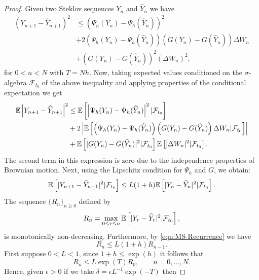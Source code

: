 	\begin{proof}
		Given two Steklov sequences $Y_n$ and $\widehat{Y}_n$ we have
		\begin{align*}
		\left(Y_{n+1}-\widehat{Y}_{n+1}\right)^ 2
		&\leq
		\left(
			\Psi_h(Y_n)
			-
			\Psi_h(\widehat{Y}_n)
		\right)^2 \\
		&+
		2\left(
		\Psi_h(Y_n)
			-
		\Psi_h(\widehat{Y}_n)
		\right)
		\left(
			G(Y_n)-G(\widehat{Y}_n)
		\right)
		\Delta W_n\\
		&+
		(G(Y_n)-G(\widehat{Y}_n))^2
		(\Delta W_n)^2,
		\end{align*}
		for $0<n<N$ with $T=Nh$. Now, taking expected values conditioned on the
		$\sigma$-algebra $\mathcal{F}_{t_0}$ of the above inequality and applying
		properties of the conditional expectation we get
		\begin{align*}
		\mathbb{E}\left|Y_{n+1}-\widehat{Y}_{n+1}\right|^2
		&\leq
		\mathbb{E}\left[
			\left|
			\Psi_h(Y_n)
			-
			\Psi_h(\widehat{Y}_n)
			\right|^2
		|\mathcal{F}_{t_0}\right]
		\\
		&+
		2\left|
		\mathbb{E}\left[
			\left(
			\Psi_h(Y_n)
			-
			\Psi_h(\widehat{Y}_n)
			\right)
		\left(
			G(Y_n)-G(\widehat{Y}_n)
		\right)
		\Delta W_n|\mathcal{F}_{t_0}\right]
		\right| \\
		&+
		\mathbb{E}\left[|G(Y_n)-G(\widehat{Y}_n)|^2|\mathcal{F}_{t_0}\right]
		\mathbb{E}\left[|\Delta W_n|^2|\mathcal{F}_{t_0}\right].
		\end{align*}
		The second term in this expression is zero due to the independence properties of
		Brownian motion. Next, using the Lipschitz condition for $\Psi_h$ and $G$, we
		obtain:
		\begin{equation}\label{eqn:MS-Recurrence}
			\mathbb{E}\left[|Y_{n+1}-\widehat{Y}_{n+1}|^2|\mathcal{F}_{t_0}\right]
			\leq L(1+h)
			\mathbb{E}\left[|Y_{n}-\widehat{Y}_{n}|^ 2|\mathcal{F}_{t_0}\right].
		\end{equation}
		The sequence $\{R_n\}_{n\geq 0}$ defined by 
		$$
			R_n=\max_{0\leq r\leq n}\mathbb{E}\left[|Y_r-\widehat{Y}_r|^2|\mathcal{F}_{t_0}\right],
		$$
		is monotonically non-decreasing. Furthermore, by \eqref{eqn:MS-Recurrence} we have
		\begin{equation}\label{eqn:AMS-Stability}
			R_n \leq L(1+h)R_{n-1}.
		\end{equation}
		First suppose $0<L<1$, since $1+h\leq \exp(h)$ it follows that
		\begin{equation}
			R_n\leq L \exp(T)R_0, \qquad n=0,\dots,N.
		\end{equation}
			Hence, given $\epsilon>0$ if we take $\delta =\epsilon L^{-1}\exp(-T)$ then

\end{proof}
